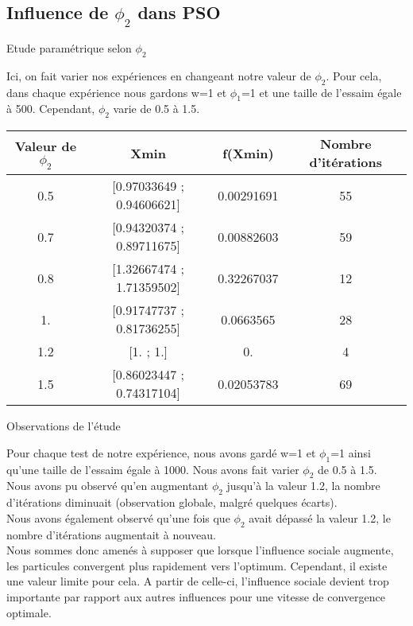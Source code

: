 \documentclass{beamer}
\begin{document}
\subsection{Influence de $\phi_2$ dans PSO}
  \begin{frame}{Etude paramétrique selon $\phi_2$}
    \begin{block}{}
      \small Ici, on fait varier nos expériences en changeant notre valeur de $\phi_2$. Pour cela, dans chaque expérience nous gardons w=1 et $\phi_1$=1 et une taille de l'essaim égale à 500. Cependant, $\phi_2$ varie de 0.5 à 1.5.
    \end{block}\pause
    \vspace{0.8 cm}
    \begin{tabular}{|c|c|c|c|}
      \hline
      \scriptsize Valeur de $\phi_2$  & \scriptsize Xmin & \scriptsize f(Xmin) & \scriptsize Nombre d'itérations \\
      \hline
      \scriptsize 0.5 &\scriptsize  [0.97033649 ; 0.94606621] & \scriptsize0.00291691 &\scriptsize 55 \\
      \hline
      \scriptsize 0.7  & \scriptsize[0.94320374 ; 0.89711675]
 & \scriptsize 0.00882603 &\scriptsize 59 \\
      \hline
      \scriptsize 0.8 &\scriptsize [1.32667474 ; 1.71359502] &\scriptsize 0.32267037 &\scriptsize 12 \\
      \hline
      \scriptsize 1. &\scriptsize [0.91747737 ; 0.81736255]
 &\scriptsize 0.0663565 &\scriptsize 28 \\
      \hline
      \scriptsize 1.2 &\scriptsize [1. ; 1.] &\scriptsize 0. &\scriptsize 4 \\
      \hline
      \scriptsize 1.5 &\scriptsize [0.86023447 ; 0.74317104] &\scriptsize 0.02053783 &\scriptsize 69 \\
      \hline
    \end{tabular}
  \end{frame}

  \begin{frame}{Observations de l'étude }
    \begin{block}{}
      Pour chaque test de notre expérience, nous avons gardé w=1 et $\phi_1$=1 ainsi qu'une taille de l'essaim égale à 1000. Nous avons fait varier $\phi_2$ de 0.5 à 1.5. \\
      Nous avons pu observé qu'en augmentant $\phi_2$ jusqu'à la valeur 1.2, la nombre d'itérations diminuait (observation globale, malgré quelques écarts). \\
      Nous avons également observé qu'une fois que $\phi_2$ avait dépassé la valeur 1.2, le nombre d'itérations augmentait à nouveau. \\
      Nous sommes donc amenés à supposer que lorsque l'influence sociale augmente, les particules convergent plus rapidement vers l'optimum. Cependant, il existe une valeur limite pour cela. A partir de celle-ci, l'influence sociale devient trop importante par rapport aux autres influences pour une vitesse de convergence optimale.
     \end{block}
  \end{frame}
\end{document}
